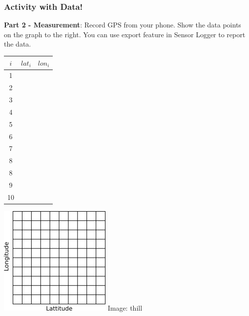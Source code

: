 \documentclass[fleqn]{beamer} %
\newcommand{\sectiontitleIV}{Activity with Data!}
\begin{document}
	\begin{frame}[label=sectionIV]
		\frametitle{\sectiontitleIV}
		\scriptsize
		{\bf Part 2 - Measurement}: Record GPS from your phone. Show the data points on the graph to the right. You can use export feature in Sensor Logger to report the data.  \\
		
		\begin{multicols}{2}

			\setlength{\tabcolsep}{20pt}
			\renewcommand{\arraystretch}{1.4}
			\begin{tabular}{|c|c|c|} \hline
			$i$ & $lat_i$ & $lon_i$ \\\hline
			  1  & &              \\ \hline
			  2  & &              \\ \hline
			  3  & &              \\ \hline
			  4  & &              \\ \hline
			  5  & &              \\ \hline
			  6  & &              \\ \hline
			  7  & &              \\ \hline
			  8  & &              \\ \hline
			  8  & &              \\ \hline		
			  9  & &              \\ \hline
             10  & &              \\ \hline
			\end{tabular}

			\includegraphics[scale=1]{lat_lon_grid.png}
			{\tiny Image: thill}
		\end{multicols}	

	\end{frame}
\end{document}
